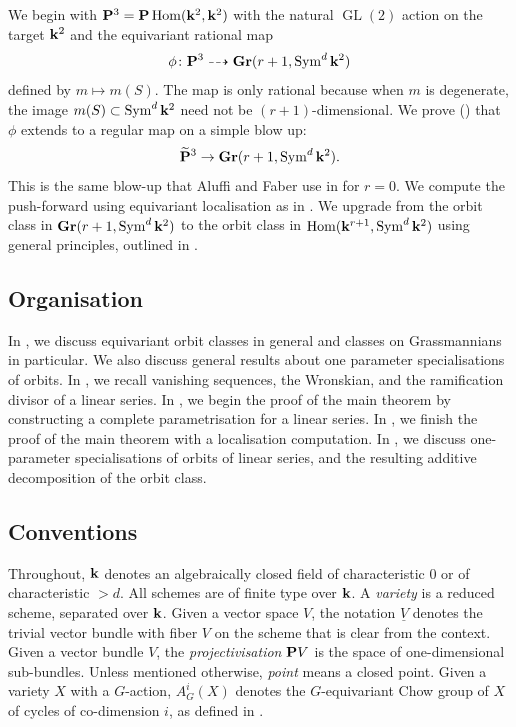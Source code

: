 \documentclass[11pt]{amsart}
\renewcommand {\P}{{\bf P}}
\providecommand {\Gr}{{\bf Gr}}
\providecommand{\GL}{\operatorname{GL}}
\providecommand{\Hom}{\operatorname{Hom}}
\providecommand{\Sym}{\operatorname{Sym}}
\begin{document}
We begin with \(\P^3 = \P\Hom(\k^{2}, \k^2)\) with the natural \(\GL(2)\) action on the target \(\mathbf k^2\) and the equivariant rational map
\[\phi \colon \P^3 \dashrightarrow \Gr(r+1, \Sym^d\k^2)\]
defined by \(m \mapsto m(S)\).
The map is only rational because when \(m\) is degenerate, the image \(m(S) \subset \Sym^d\k^2\) need not be \((r+1)\)-dimensional.
We prove () that \(\phi\) extends to a regular map on a simple blow up:
\begin{equation}\label{eq:res}
  \widetilde{\P}^3 \to \Gr(r+1, \Sym^d\k^2).
\end{equation}
This is the same blow-up that Aluffi and Faber use in \cite{alu.fab:93*1} for \(r = 0\).
We compute the push-forward using equivariant localisation as in \cite[Appendix~B]{lee.pat.tse:19}.
We upgrade from the orbit class in \(\Gr(r+1,\Sym^d\k^2)\) to the orbit class in \(\Hom(\k^{r+1}, \Sym^d\k^2)\) using general principles, outlined in .

\subsection{Organisation}
In , we discuss equivariant orbit classes in general and classes on Grassmannians in particular.
We also discuss general results about one parameter specialisations of orbits.
In , we recall vanishing sequences, the Wronskian, and the ramification divisor of a linear series.
In , we begin the proof of the main theorem by constructing a complete parametrisation for a linear series.
In , we finish the proof of the main theorem with a localisation computation.
In , we discuss one-parameter specialisations of orbits of linear series, and the resulting additive decomposition of the orbit class.

\subsection{Conventions}
Throughout, \(\mathbf k\) denotes an algebraically closed field of characteristic 0 or of characteristic \(> d\).
All schemes are of finite type over \(\mathbf k\).
A \emph{variety} is a reduced scheme, separated over \(\mathbf k\).
Given a vector space \(V\), the notation \(\underline V\) denotes the trivial vector bundle with fiber \(V\) on the scheme that is clear from the context.
Given a vector bundle \(V\), the \emph{projectivisation} \(\P V\) is the space of one-dimensional sub-bundles.
Unless mentioned otherwise, \emph{point} means a closed point.
Given a variety \(X\) with a \(G\)-action, \(A^i_G(X)\) denotes the \(G\)-equivariant Chow group of \(X\) of cycles of co-dimension \(i\), as defined in \cite{edi.gra:98}.
\end{document}
